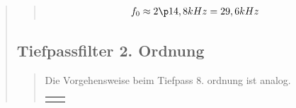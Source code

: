 \begin{quote}
\begin{quote}
        \begin{equation}
    	\begin{split}
            f_0 \approx 2 \p 14,8 kHz = 29,6 kHz
    	\end{split}
        \end{equation}
    \end{quote}



    \subsection{Tiefpassfilter 2. Ordnung}
    \begin{quote}
        
        Die Vorgehensweise beim Tiefpass 8. ordnung ist analog.
        
        
        \begin{center}
        \vspace{-1.5cm}
                
        \end{center}
        \begin{tabular}{ll}
        
        \hspace{-4.5cm}
            \begin{minipage}{0.6\textwidth}
                

\end{minipage}
\end{tabular}
\end{quote}
\end{quote}
